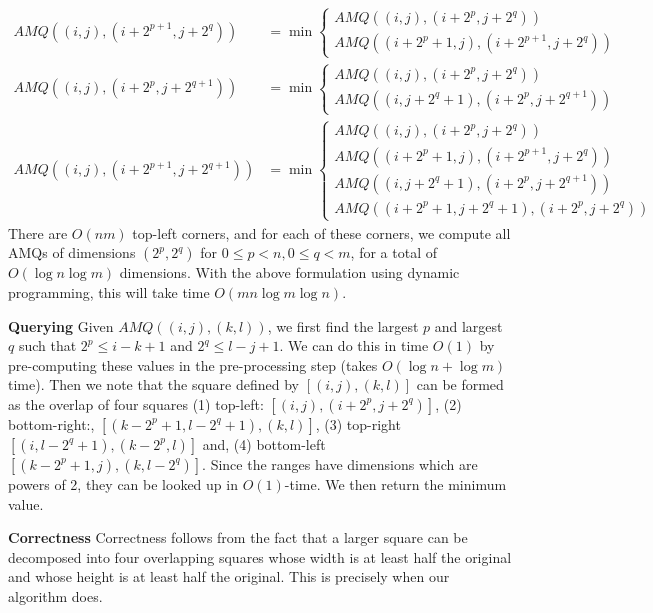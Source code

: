 \documentclass[12pt]{exam}
\newcommand*{\bigo}[1]{O \left( #1 \right)}
\begin{document}
\begin{questions}
\begin{parts}
\begin{solution}
\begin{align*}
  AMQ((i,j), (i + 2^{p+1}, j + 2^q)) &= \min
    \begin{cases} 
      AMQ((i, j), (i + 2^p, j + 2^q)) \\
      AMQ((i + 2^p + 1, j), (i + 2^{p+1}, j + 2^q))
    \end{cases} \\
  AMQ((i,j), (i + 2^p, j + 2^{q+1})) &= \min
    \begin{cases} 
      AMQ((i, j), (i + 2^p, j + 2^q)) \\
      AMQ((i, j + 2^q + 1), (i + 2^p, j + 2^{q+1}))
    \end{cases} \\
  AMQ((i,j), (i + 2^{p+1}, j + 2^{q+1})) &= \min 
    \begin{cases}
      AMQ((i, j), (i + 2^p, j + 2^q))\\
      AMQ((i + 2^p + 1, j), (i + 2^{p+1}, j + 2^q))\\
      AMQ((i, j + 2^q + 1), (i + 2^p, j+2^{q+1}))\\
      AMQ((i + 2^{p} + 1, j + 2^{q} + 1),(i + 2^p, j + 2^q))
    \end{cases}
\end{align*}
There are $\bigo{nm}$ top-left corners, and for each of these corners, we compute all AMQs of dimensions $(2^p, 2^q)$ for $0 \leq p < n, 0 \leq q < m$, for a total of $\bigo{\log n \log m}$ dimensions. With the above formulation using dynamic programming, this will take time $\bigo{mn \log m \log n}$.

\textbf{Querying}
Given $AMQ((i,j), (k,l))$, we first find the largest $p$ and largest $q$ such that $2^p \leq i - k + 1$ and $2^q \leq l - j + 1$. We can do this in time $\bigo{1}$ by pre-computing these values in the pre-processing step (takes $\bigo{\log n + \log m}$ time). Then we note that the square defined by $[(i,j), (k,l)]$ can be formed as the overlap of four squares (1) top-left: $[(i,j), (i + 2^p, j + 2^q)]$, (2) bottom-right:, $[(k - 2^p + 1, l - 2^q + 1), (k,l)]$, (3) top-right $[(i, l - 2^q + 1), (k - 2^p, l)]$ and, (4) bottom-left $[(k - 2^p + 1, j), (k, l - 2^q)]$. Since the ranges have dimensions which are powers of 2, they can be looked up in $\bigo{1}$-time. We then return the minimum value.

\textbf{Correctness}
Correctness follows from the fact that a larger square can be decomposed into four overlapping squares whose width is at least half the original and whose height is at least half the original. This is precisely when our algorithm does.


\end{solution}
\end{parts}
\end{questions}
\end{document}
